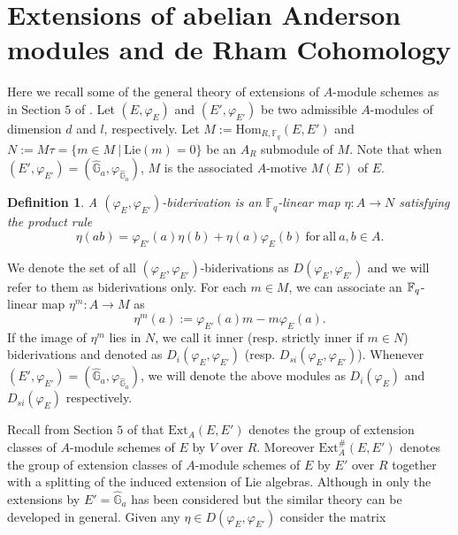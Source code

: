 \documentclass{amsart}
\newtheorem {definition}[theorem]{\bf Definition}
\numberwithin {equation}{section}
\begin{document}
\section{Extensions of abelian Anderson modules and de Rham Cohomology}
Here we recall some of the general theory of extensions of $A$-module schemes as in Section $5$ of \cite{Gekeler_a}. Let $(E,\varphi_{E})$ and $(E',\varphi_{E'})$ be two admissible $A$-modules of dimension $d$ and $l$, respectively. Let $M:=\mathrm{Hom}_{R,\mathbb{F}_q}(E,E')$ and $N:=M\tau=\{m\in M~|~\mathrm{Lie}(m)=0\}$ be an $A_{R}$ submodule of $M$. Note that when $(E',\varphi_{E'})=(\hat{\mathbb{G}}_{a},\varphi_{\hat{\mathbb{G}}_a})$, $M$ is the associated $A$-motive $M(E)$ of $E$.

\begin{definition} A $(\varphi_{E},\varphi_{E'})$-biderivation is an $\mathbb{F}_{q}$-linear map $\eta:A\longrightarrow N$ satisfying the product rule $$\eta(ab)=\varphi_{E'}(a)\eta(b)+\eta(a)\varphi_{E}(b) ~\mathrm{for~ all} ~a,b \in A.$$
\end{definition}
We denote the set of all $(\varphi_{E},\varphi_{E'})$-biderivations as $D(\varphi_{E},\varphi_{E'})$ and we will refer to them as biderivations only. 
For each $m\in M$, we can associate an $\mathbb{F}_{q}$-linear map $\eta^{m}:A\longrightarrow M$ as $$\eta^{m}(a):=\varphi_{E'}(a)m-m\varphi_{E}(a).$$ If the image of $\eta^{m}$ lies in $N$, we call it inner (resp. strictly inner if $m\in N$) biderivations and denoted as $D_{i}(\varphi_{E},\varphi_{E'})$ (resp. $D_{si}(\varphi_{E},\varphi_{E'})$). Whenever  $(E',\varphi_{E'})=(\hat{\mathbb{G}}_{a},\varphi_{\hat{\mathbb{G}}_a})$, we will denote the
above modules as $D_i(\varphi_E)$ and $D_{si}(\varphi_E)$ respectively.

\noindent Recall from Section $5$ of \cite{Gekeler_a} that $\mathrm{Ext}_{A}(E,E')$ denotes the group of extension classes of $A$-module schemes of $E$ by $V$ over $R$. Moreover $\mathrm{Ext}^{\#}_{A}(E,E')$ denotes the group of extension classes of $A$-module schemes of $E$ by $E'$ over $R$ together with a splitting of the 
induced extension of Lie algebras.
Although in \cite{Gekeler_a} only the extensions by $E'={\hat{\mathbb{G}}_a}$ has been considered but the similar theory can be developed in general. Given any $\eta \in D(\varphi_{E},\varphi_{E'})$ consider the matrix 
\end{document}
